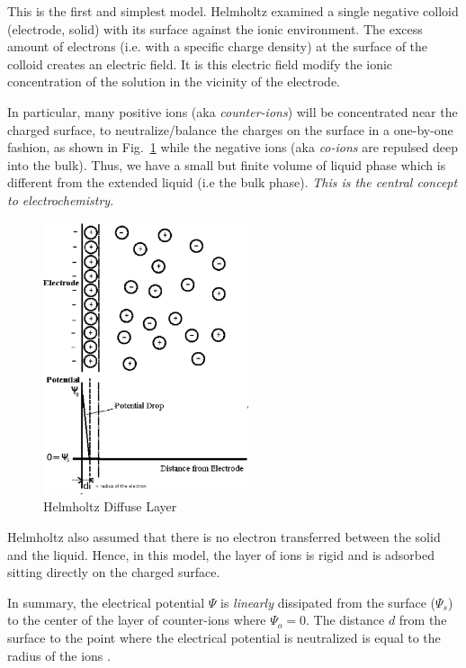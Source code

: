 This is the first and simplest model. Helmholtz examined a single
negative colloid (electrode, solid) with its surface against the ionic
environment.  The excess amount of electrons (i.e. with a specific
charge density) at the surface of the colloid creates an electric
field. It is this electric field modify the ionic concentration of the
solution in the vicinity of the electrode.

In particular, many positive ions (aka {\it counter-ions}) will be
concentrated near the charged surface, to neutralize/balance the
charges on the surface in a one-by-one fashion, as shown in
Fig.~\ref{fig:Helmholtz-DL} while the negative ions (aka {\it co-ions}
are repulsed deep into the bulk).  Thus, we have a small but finite
volume of liquid phase which is different from the extended liquid
(i.e the bulk phase).
{\it This is the central concept to electrochemistry}.
\begin{figure}[htb]
  \centerline{\includegraphics[height=8cm]{./images/Helmholtz-diffuse-layer.eps}}
  \caption{Helmholtz Diffuse Layer}\label{fig:Helmholtz-DL}
\end{figure}
Helmholtz also assumed that there is no electron transferred between
the solid and the liquid. Hence, in this model, the layer of ions is
rigid and is adsorbed sitting directly on the charged surface.

In summary, the electrical potential $\Psi$ is {\it linearly}
dissipated from the surface ($\Psi_s$) to the center of the layer of
counter-ions where $\Psi_o = 0$. The distance $d$ from the surface to
the point where the electrical potential is neutralized is equal to
the radius of the ions \citep{lyklema1995fic}.


